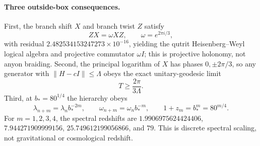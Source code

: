 \paragraph{Three outside-box consequences.}
First, the branch shift $X$ and branch twist $Z$ satisfy
\[
 ZX=\omega XZ,\qquad \omega=e^{2\pi i/3},
\]
with residual $2.482534153247273\times10^{-16}$, yielding the qutrit Heisenberg--Weyl logical algebra and projective commutator $\omega I$; this is projective holonomy, not anyon braiding.
Second, the principal logarithm of $X$ has phases $0,\pm2\pi/3$, so any generator with $\|H-cI\|\le\Lambda$ obeys the exact unitary-geodesic limit
\[
 T\ge\frac{2\pi}{3\Lambda}.
\]
Third, at $b_*=80^{1/4}$ the hierarchy obeys
\[
 \lambda_{n+m}=\lambda_n b_*^{-2m},\qquad
 \omega_{n+m}=\omega_n b_*^{-m},\qquad
 1+z_m=b_*^m=80^{m/4}.
\]
For $m=1,2,3,4$, the spectral redshifts are
$1.9906975624424406$, $7.944271909999156$, $25.749612199056866$, and $79$.
This is discrete spectral scaling, not gravitational or cosmological redshift.
